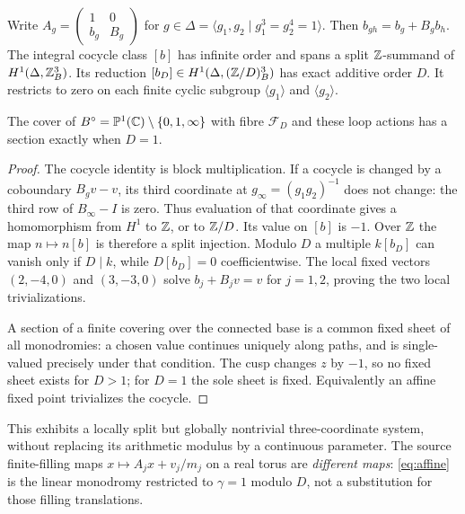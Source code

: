 \begin{theorem}\label{thm:class}
Write $A_g=\left(\begin{smallmatrix}1&0\\b_g&B_g\end{smallmatrix}\right)$ for
$g\in\Delta=\langle g_1,g_2\mid g_1^3=g_2^4=1\rangle$.
Then $b_{gh}=b_g+B_gb_h$. The integral cocycle class $[b]$ has infinite
order and spans a split $\mathbb Z$-summand of $H^1(\Delta,\mathbb Z^3_B)$.
Its reduction $[b_D]\in H^1(\Delta,(\mathbb Z/D)^3_B)$ has exact additive order $D$.
It restricts to zero on each finite cyclic subgroup $\langle g_1\rangle$ and
$\langle g_2\rangle$.

The cover of $B^\circ=\mathbb P^1(\mathbb C)\setminus\{0,1,\infty\}$ with fibre
$\mathcal F_D$ and these loop actions has a section exactly when $D=1$.
\end{theorem}
\begin{proof}
The cocycle identity is block multiplication. If a cocycle is changed by a
coboundary $B_gv-v$, its third coordinate at $g_\infty=(g_1g_2)^{-1}$
does not change: the third row of $B_\infty-I$ is zero.
Thus evaluation of that coordinate gives a homomorphism from $H^1$ to
$\mathbb Z$, or to $\mathbb Z/D$. Its value on $[b]$ is $-1$. Over $\mathbb Z$ the map
$n\mapsto n[b]$ is therefore a split injection. Modulo $D$ a multiple
$k[b_D]$ can vanish only if $D\mid k$, while $D[b_D]=0$ coefficientwise.
The local fixed vectors $(2,-4,0)$ and $(3,-3,0)$ solve
$b_j+B_jv=v$ for $j=1,2$, proving the two local trivializations.

A section of a finite covering over the connected base is a common fixed
sheet of all monodromies: a chosen value continues uniquely along paths,
and is single-valued precisely under that condition. The cusp changes
$z$ by $-1$, so no fixed sheet exists for $D>1$; for $D=1$ the sole sheet
is fixed. Equivalently an affine fixed point trivializes the cocycle.
\end{proof}

This exhibits a locally split but globally nontrivial three-coordinate
system, without replacing its arithmetic modulus by a continuous parameter.
The source finite-filling maps $x\mapsto A_jx+v_j/m_j$ on a real torus
are \emph{different maps}: \eqref{eq:affine} is the linear monodromy restricted
to $\gamma=1$ modulo $D$, not a substitution for those filling translations.

